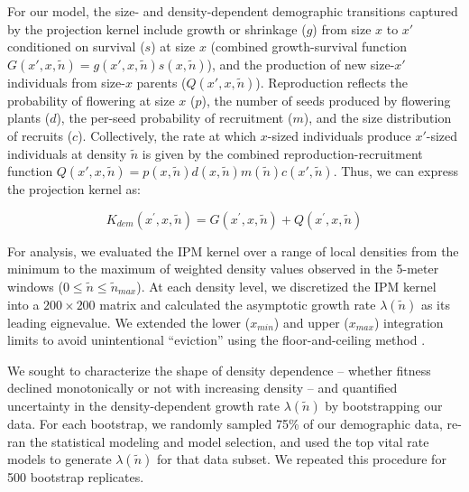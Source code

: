 \documentclass[11pt]{article}\usepackage[]{graphicx}\usepackage[usenames,dvipsnames]{xcolor}
\begin{document}
For our model, the size- and density-dependent demographic transitions captured by the projection kernel include growth or shrinkage ($g$) from size $x$ to $x\prime$ conditioned on survival ($s$) at size $x$ (combined growth-survival function $G(x\prime,x,\tilde{n}) = g(x\prime,x,\tilde{n})s(x,\tilde{n})$), and the production of new size-$x\prime$ individuals from size-$x$ parents ($Q(x\prime,x,\tilde{n})$). Reproduction reflects the probability of flowering at size $x$ ($p$), the number of seeds produced by flowering plants ($d$), the per-seed probability of recruitment ($m$), and the size distribution of recruits ($c$). Collectively, the rate at which $x$-sized individuals produce $x\prime$-sized individuals at density $\tilde{n}$ is given by the combined reproduction-recruitment function $Q(x\prime,x,\tilde{n})=p(x,\tilde{n})d(x,\tilde{n})m(\tilde{n})c(x\prime,\tilde{n})$. Thus, we can express the projection kernel as:
\begin{linenomath*} 
\begin{equation}  \label{eq:K}
K_{dem}(x^\prime,x,\tilde{n}) = G(x^\prime,x,\tilde{n}) + Q(x^\prime,x,\tilde{n})
\end{equation} 
\end{linenomath*}
For analysis, we evaluated the IPM kernel over a range of local densities from the minimum to the maximum of weighted density values observed in the 5-meter windows ($0 \leq \tilde{n} \leq \tilde{n}_{max}$). 
At each density level, we discretized the IPM kernel into a $200 \times 200$ matrix and calculated the asymptotic growth rate $\lambda(\tilde{n})$ as its leading eignevalue. 
We extended the lower ($x_{min}$) and upper ($x_{max}$) integration limits to avoid unintentional ``eviction'' using the floor-and-ceiling method \citep{williams2012avoiding}.

We sought to characterize the shape of density dependence -- whether fitness declined monotonically or not with increasing density -- and quantified uncertainty in the density-dependent growth rate $\lambda(\tilde{n})$ by bootstrapping our data. 
For each bootstrap, we randomly sampled 75\% of our demographic data, re-ran the statistical modeling and model selection, and used the top vital rate models to generate $\lambda(\tilde{n})$ for that data subset. 
We repeated this procedure for 500 bootstrap replicates. 
\end{document}
